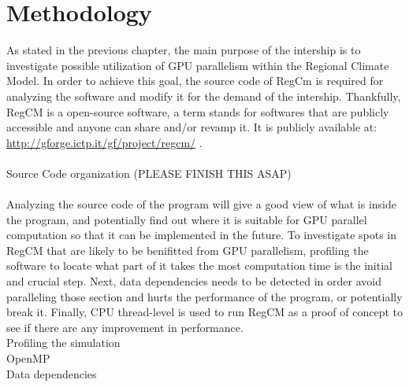 \chapter{Methodology}

As stated in the previous chapter, the main purpose of the intership is to investigate possible utilization of GPU parallelism within the Regional Climate Model. In order to achieve this goal, the source code of RegCm is required for analyzing the software and modify it for the demand of the intership. Thankfully, RegCM is a open-source software, a term stands for softwares that are publicly accessible and anyone can share and/or revamp it. It is publicly available at: \url{http://gforge.ictp.it/gf/project/regcm/} . \\
~\\
Source Code organization (PLEASE FINISH THIS ASAP) \\
~\\
Analyzing the source code of the program will give a good view of what is inside the program, and potentially find out where it is suitable for GPU parallel computation so that it can be implemented in the future. To investigate spots in RegCM that are likely to be benifitted from GPU parallelism, profiling the software to locate what part of it takes the most computation time is the initial and crucial step. Next, data dependencies needs to be detected in order avoid paralleling those section and hurts the performance of the program, or potentially break it. Finally, CPU thread-level is used to run RegCM as a proof of concept to see if there are any improvement in performance. \\

Profiling the simulation\\
OpenMP\\
Data dependencies\\

